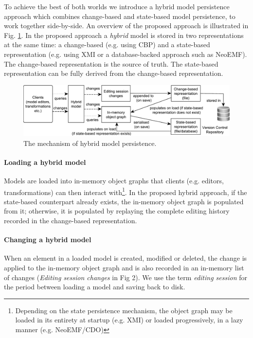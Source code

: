 \documentclass[sigplan,review,anonymous]{acmart}\settopmatter{printfolios=true,printccs=false,printacmref=false}
\begin{document}
To achieve the best of both worlds we introduce a hybrid model persistence approach which combines change-based and state-based model persistence, to work together side-by-side. An overview of the proposed approach is illustrated in Fig. \ref{fig:hybrid_persistence}. In the proposed approach a \textit{hybrid} model is stored in two representations at the same time: a change-based (e.g. using CBP) and a state-based representation (e.g. using XMI or a database-backed approach such as NeoEMF). The change-based representation is the source of truth. The state-based representation can be fully derived from the change-based representation.

\begin{figure}[ht]
    \includegraphics[width=\linewidth]{images/hybrid_persistence}
    \caption{The mechanism of hybrid model persistence.}
    \label{fig:hybrid_persistence}
\end{figure}

\paragraph{Loading a hybrid model} Models are loaded into in-memory object graphs that clients (e.g. editors, transformations) can then interact with\footnote{Depending on the state persistence mechanism, the object graph may be loaded in its entirety at startup (e.g. XMI) or loaded progressively, in a lazy manner (e.g. NeoEMF/CDO)}. In the proposed hybrid approach, if the state-based counterpart already exists, the in-memory object graph is populated from it; otherwise, it is populated by replaying the complete editing history recorded in the change-based representation.

\paragraph{Changing a hybrid model} When an element in a loaded model is created, modified or deleted, the change is applied to the in-memory object graph and is also recorded in an in-memory list of changes (\textit{Editing session changes} in Fig 2). We use the term \emph{editing session} for the period between loading a model and saving back to disk. 
\end{document}
